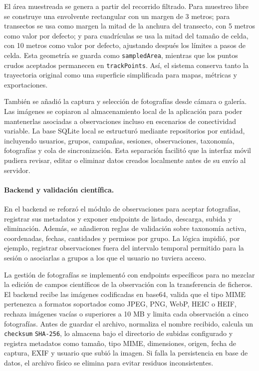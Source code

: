 El área muestreada se genera a partir del recorrido filtrado. Para muestreo
libre se construye una envolvente rectangular con un margen de 3 metros; para
transectos se usa como margen la mitad de la anchura del transecto, con 5 metros
como valor por defecto; y para cuadrículas se usa la mitad del tamaño de celda,
con 10 metros como valor por defecto, ajustando después los límites a pasos de
celda. Esta geometría se guarda como \texttt{sampledArea}, mientras que los
puntos crudos aceptados permanecen en \texttt{trackPoints}. Así, el sistema
conserva tanto la trayectoria original como una superficie simplificada para
mapas, métricas y exportaciones.

También se añadió la captura y selección de fotografías desde cámara o galería.
Las imágenes se copiaron al almacenamiento local de la aplicación para poder
mantenerlas asociadas a observaciones incluso en escenarios de conectividad
variable. La base SQLite local \cite{sqlite} se estructuró mediante repositorios por entidad,
incluyendo usuarios, grupos, campañas, sesiones, observaciones, taxonomía,
fotografías y cola de sincronización. Esta separación facilitó que la interfaz
móvil pudiera revisar, editar o eliminar datos creados localmente antes de su
envío al servidor.

\paragraph{Backend y validación científica.}
En el backend se reforzó el módulo de observaciones para aceptar fotografías,
registrar sus metadatos y exponer endpoints de listado, descarga, subida y
eliminación. Además, se añadieron reglas de validación sobre taxonomía activa,
coordenadas, fechas, cantidades y permisos por grupo. La lógica impidió, por
ejemplo, registrar observaciones fuera del intervalo temporal permitido para la
sesión o asociarlas a grupos a los que el usuario no tuviera acceso.

La gestión de fotografías se implementó con endpoints específicos para no
mezclar la edición de campos científicos de la observación con la transferencia
de ficheros. El backend recibe las imágenes codificadas en base64, valida que el
tipo MIME pertenezca a formatos soportados como JPEG, PNG, WebP, HEIC o HEIF,
rechaza imágenes vacías o superiores a 10 MB y limita cada observación a cinco
fotografías. Antes de guardar el archivo, normaliza el nombre recibido, calcula
un \texttt{checksum} \texttt{SHA-256}, lo almacena bajo el directorio de subidas
configurado y registra metadatos como tamaño, tipo MIME, dimensiones, origen,
fecha de captura, EXIF y usuario que subió la imagen. Si falla la persistencia
en base de datos, el archivo físico se elimina para evitar residuos
inconsistentes.

